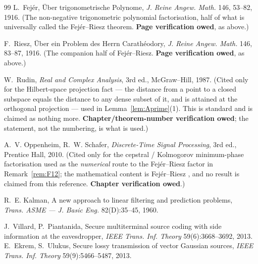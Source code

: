 \documentclass[11pt]{article}
\theoremstyle{definition}
\theoremstyle{remark}
\begin{document}
\begin{thebibliography}{99}
 L.~Fej\'er, \"Uber trigonometrische Polynome,
\emph{J. Reine Angew. Math.} 146, 53--82, 1916. (The non-negative
trigonometric polynomial factorisation, half of what is universally called
the Fej\'er--Riesz theorem. \textbf{Page verification owed}, as above.)

 F.~Riesz, \"Uber ein Problem des Herrn Carath\'eodory,
\emph{J. Reine Angew. Math.} 146, 83--87, 1916. (The companion half of
Fej\'er--Riesz. \textbf{Page verification owed}, as above.)

 W.~Rudin, \emph{Real and Complex Analysis}, 3rd ed.,
McGraw--Hill, 1987. (Cited only for the Hilbert-space projection fact --- the
distance from a point to a closed subspace equals the distance to any dense
subset of it, and is attained at the orthogonal projection --- used in
Lemma~\ref{lem:Aprime}(1). This is standard and is claimed as nothing more.
\textbf{Chapter/theorem-number verification owed}; the statement, not the
numbering, is what is used.)

 A.~V. Oppenheim, R.~W. Schafer, \emph{Discrete-Time Signal
Processing}, 3rd ed., Prentice Hall, 2010. (Cited only for the cepstral /
Kolmogorov minimum-phase factorisation used as the \emph{numerical} route to
the Fej\'er--Riesz factor in Remark~\ref{rem:F12}; the mathematical content is
Fej\'er--Riesz \cite{bib:fejer16,bib:riesz16}, and no result is claimed from
this reference. \textbf{Chapter verification owed}.)

 R.~E. Kalman, A new approach to linear
filtering and prediction problems, \emph{Trans. ASME --- J. Basic
Eng.} 82(D):35--45, 1960.

 J.~Villard, P.~Piantanida, Secure multiterminal
source coding with side information at the eavesdropper, \emph{IEEE Trans.
Inf. Theory} 59(6):3668--3692, 2013.
 E.~Ekrem, S.~Ulukus, Secure lossy transmission of
vector Gaussian sources, \emph{IEEE Trans. Inf. Theory} 59(9):5466--5487,
2013.
\end{thebibliography}
\end{document}
